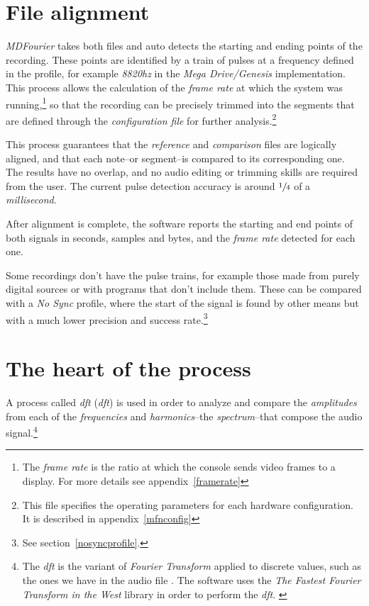 \documentclass[10pt,a4paper]{report}
\newcommand{\define}[1]{\textit{\acrlong{#1}} (\textit{\acrshort{#1}})}
\newcommand{\ac}[1]{\textit{\mbox{\acrshort{#1}}}}
\newcommand{\hz}[1]{\textit{\mbox{#1\acrshort{hz}}}}
\begin{document}
\section{File alignment}

\textit{MDFourier} takes both files and auto detects the starting and ending points of the recording. These points are identified by a train of pulses at a frequency defined in the profile, for example \hz{8820} in the \textit{Mega Drive/Genesis} implementation. This process allows the calculation of the \textit{frame rate} at which the system was running,\footnote{The \textit{frame rate} is the ratio at which the console sends video frames to a display. For more details see appendix~\ref{framerate}} so that the recording can be precisely trimmed into the segments that are defined through the \textit{configuration file} for further analysis.\footnote{This file specifies the operating parameters for each hardware configuration. It is described in appendix~\ref{mfnconfig}}

This process guarantees that the \textit{reference} and \textit{comparison} files are logically aligned, and that each note--or segment--is compared to its corresponding one. The results have no overlap, and no audio editing or trimming skills are required from the user. The current pulse detection accuracy is around $\sfrac{1}{4}$ of a \textit{millisecond}.

After alignment is complete, the software reports the starting and end points of both signals in seconds, samples and bytes, and the \textit{frame rate} detected for each one.

Some recordings don't have the pulse trains, for example those made from purely digital sources or with programs that don't include them. These can be compared with a \textit{No Sync} profile, where the start of the signal is found by other means but with a much lower precision and success rate.\footnote{See section~\ref{nosyncprofile}.}

\section{The heart of the process}

A process called \define{dft} is used in order to analyze and compare the \textit{amplitudes} from each of the \textit{frequencies} and \textit{harmonics}--the \textit{spectrum}--that compose the audio signal.\footnote{The \ac{dft} is the variant of \textit{Fourier Transform} applied to discrete values, such as the ones we have in the audio file \cite{FourierTransformApps}. The software uses the \textit{The Fastest Fourier Transform in the West} library in order to perform the \ac{dft}. \cite{fftw}}
\end{document}
